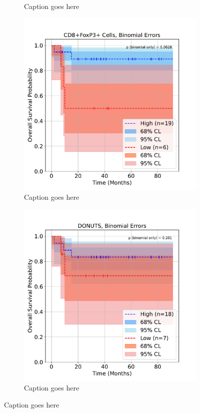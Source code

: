 \documentclass[article]{jss}
\begin{document}
\begin{figure}
\begin{subfigure}[t]{0.49\textwidth}
    \caption{\label{fig:lung-dataset-donuts-patient-wise} Caption goes here}
  \end{subfigure}
  \begin{subfigure}[t]{0.49\textwidth}
    \centering
    \includegraphics[width=\linewidth]{lung_cells_km_OS_binomial.pdf}
    \caption{\label{fig:lung-dataset-cells-binomial} Caption goes here}
  \end{subfigure}
  \begin{subfigure}[t]{0.49\textwidth}
    \centering
    \includegraphics[width=\linewidth]{lung_donuts_km_OS_binomial.pdf}
    \caption{\label{fig:lung-dataset-donuts-binomial} Caption goes here}
  \end{subfigure}
  \caption{\label{fig:lung-dataset} Caption goes here}
\end{figure}
\end{document}
